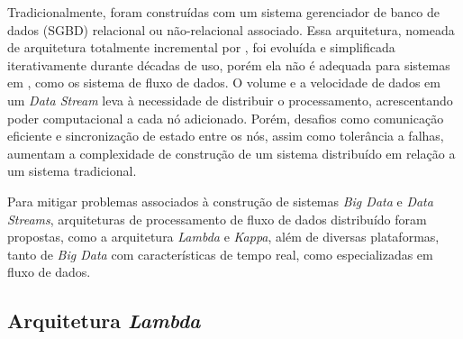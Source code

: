 
Tradicionalmente,  foram construídas com um sistema gerenciador de
banco de dados (SGBD) relacional ou não-relacional associado. Essa arquitetura,
nomeada de arquitetura totalmente incremental por ,
foi evoluída e simplificada iterativamente durante décadas de uso, porém ela não
é adequada para sistemas em 
, como os sistema de fluxo de dados.
O volume e a velocidade de dados em um \emph{Data Stream} leva à necessidade de
distribuir o processamento, acrescentando poder computacional a cada nó
adicionado.
Porém, desafios como comunicação eficiente e sincronização de estado
entre os nós, assim como tolerância a falhas, aumentam a complexidade de
construção de um sistema distribuído em relação a um sistema tradicional.


\newcommand{\lambdaa}{\xspace\emph{Lambda}\xspace}
\newcommand{\kappaa}{\xspace\emph{Kappa}\xspace}

Para mitigar problemas associados à construção de sistemas \emph{Big Data}
e \emph{Data Streams},
arquiteturas de processamento de fluxo
de dados distribuído foram propostas, como a arquitetura \lambdaa
\cite{marz2015big} e \kappaa \cite{Kreps2014}, além
de
diversas plataformas, tanto de \emph{Big Data} com características de tempo real,
como especializadas em fluxo de dados.


\subsection{Arquitetura \lambdaa {}}

